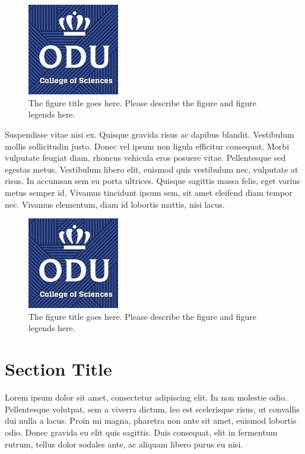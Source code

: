 \begin{figure}[tbh]
  \centering
  \includegraphics[height=4cm]{Figures/cos1.jpeg}
  \caption[The figure title goes here.]{The figure title goes here. Please describe the figure and figure legends here.}
  \label{fig:cos1_21}
\end{figure}


Suspendisse vitae nisi ex. Quisque gravida risus ac dapibus blandit. Vestibulum mollis sollicitudin justo. Donec vel ipsum non ligula efficitur consequat. Morbi vulputate feugiat diam, rhoncus vehicula eros posuere vitae. Pellentesque sed egestas metus. Vestibulum libero elit, euismod quis vestibulum nec, vulputate at risus. In accumsan sem eu porta ultrices. Quisque sagittis massa felis, eget varius metus semper id. Vivamus tincidunt ipsum sem, sit amet eleifend diam tempor nec. Vivamus elementum, diam id lobortis mattis, nisi lacus.

\begin{figure}[tbh]
  \centering
  \includegraphics[height=4cm]{Figures/cos1.jpeg}
  \caption[The figure title goes here.]{The figure title goes here. Please describe the figure and figure legends here.}
  \label{fig:cos1_22}
\end{figure}

\section{Section Title}
Lorem ipsum dolor sit amet, consectetur adipiscing elit. In non molestie odio. Pellentesque volutpat, sem a viverra dictum, leo est scelerisque risus, ut convallis dui nulla a lacus. Proin mi magna, pharetra non ante sit amet, euismod lobortis odio. Donec gravida eu elit quis sagittis. Duis consequat, elit in fermentum rutrum, tellus dolor sodales ante, ac aliquam libero purus eu nisi. 

